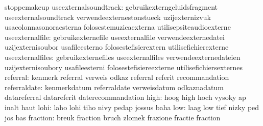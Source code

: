                                   stoppemakeup
           useexternalsoundtrack: gebruikexterngeluidsfragment     useexternalsoundtrack
                                  verwendeexternestonstueck        uzijexternizvuk
                                  usacolonnasonoraesterna          folosestemuzicaexterna
                                  utilisepsiteaudioexterne
                 useexternalfile: gebruikexternefile               useexternalfile
                                  verwendeexternedatei             uzijexternisoubor
                                  usafileesterno                   folosestefisierextern
                                  utilisefichierexterne
                useexternalfiles: gebruikexternefiles              useexternalfiles
                                  verwendeexternedateien           uzijexternisoubory
                                  usafileesterni                   folosestefisiereexterne
                                  utilisefichiersexternes
                        referral: kenmerk                          referral
                                  verweis                          odkaz
                                  referral                         referit
                                  recommandation
                    referraldate: kenmerkdatum                     referraldate
                                  verweisdatum                     odkaznadatum
                                  datareferral                     datareferit
                                  daterecommandation
                            high: hoog                             high
                                  hoch                             vysoky
                                  ap                               inalt
                                  haut
                            lohi: laho                             lohi
                                  tiho                             nivy
                                  pedap                            jossus
                                  baha
                             low: laag                             low
                                  tief                             nizky
                                  ped                              jos
                                  bas
                        fraction: breuk                            fraction
                                  bruch                            zlomek
                                  frazione                         fractie
                                  fraction
